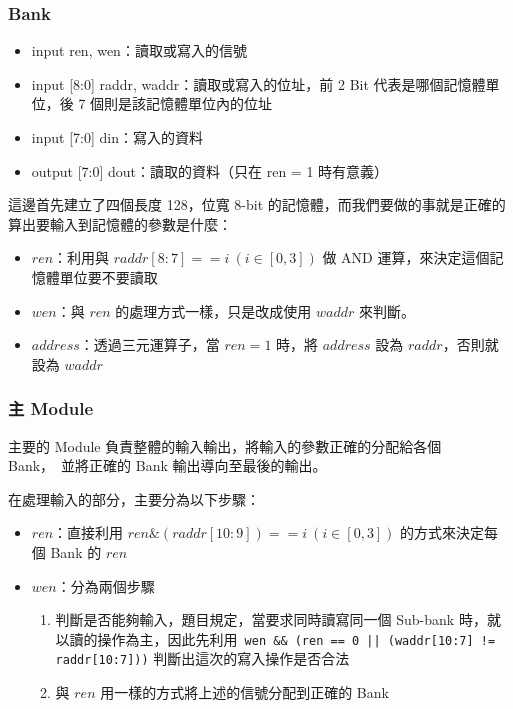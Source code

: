 \documentclass[10.5pt,compsoc,UTF8]{CjC}
\theoremstyle{mystyle}
\begin{document}
\subsubsection*{Bank}

\begin{itemize}
  \item input ren, wen：讀取或寫入的信號
  \item input [8:0] raddr, waddr：讀取或寫入的位址，前 2 Bit 代表是哪個記憶體單位，後 7 個則是該記憶體單位內的位址
  \item input [7:0] din：寫入的資料
  \item output [7:0] dout：讀取的資料（只在 ren = 1 時有意義）
\end{itemize}

這邊首先建立了四個長度 128，位寬 8-bit 的記憶體，而我們要做的事就是正確的算出要輸入到記憶體的參數是什麼：
\begin{itemize}
  \item $ren$：利用與 $raddr[8:7] == i\ (i \in [0, 3])$ 做 AND 運算，來決定這個記憶體單位要不要讀取
  \item $wen$：與 $ren$ 的處理方式一樣，只是改成使用 $waddr$ 來判斷。
  \item $address$：透過三元運算子，當 $ren = 1$ 時，將 $address$ 設為 $raddr$，否則就設為 $waddr$
\end{itemize}


\subsubsection*{主 Module}

主要的 Module 負責整體的輸入輸出，將輸入的參數正確的分配給各個 Bank，\
並將正確的 Bank 輸出導向至最後的輸出。

在處理輸入的部分，主要分為以下步驟：
\begin{itemize}
  \item $ren$：直接利用 $ren \& (raddr[10:9]) == i\ (i \in [0, 3])$ 的方式來決定每個 Bank 的 $ren$
  \item $wen$：分為兩個步驟
  \begin{enumerate}
    \item 判斷是否能夠輸入，題目規定，當要求同時讀寫同一個 Sub-bank 時，就以讀的操作為主，因此先利用\
    \texttt{wen \&\& (ren == 0 || (waddr[10:7] != raddr[10:7]))} 判斷出這次的寫入操作是否合法
    \item 與 $ren$ 用一樣的方式將上述的信號分配到正確的 Bank
  \end{enumerate}
\end{itemize}
\end{document}

